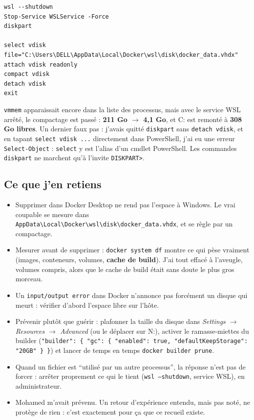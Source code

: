 \documentclass[10pt,twoside,openany]{article}
\begin{document}
\begin{lstlisting}
wsl --shutdown
Stop-Service WSLService -Force
diskpart

select vdisk file="C:\Users\DELL\AppData\Local\Docker\wsl\disk\docker_data.vhdx"
attach vdisk readonly
compact vdisk
detach vdisk
exit
\end{lstlisting}

\texttt{vmmem} apparaissait encore dans la liste des processus, mais avec le service WSL arrêté, le compactage est passé : \textbf{211 Go $\rightarrow$ 4,1 Go}, et C: est remonté à \textbf{308 Go libres}. Un dernier faux pas : j'avais quitté \texttt{diskpart} sans \texttt{detach vdisk}, et en tapant \texttt{select vdisk ...} directement dans PowerShell, j'ai eu une erreur \texttt{Select-Object} : \texttt{select} y est l'alias d'un cmdlet PowerShell. Les commandes \texttt{diskpart} ne marchent qu'à l'invite \texttt{DISKPART>}.

\subsection*{Ce que j'en retiens}
\begin{itemize}
  \item Supprimer dans Docker Desktop ne rend pas l'espace à Windows. Le vrai coupable se mesure dans \texttt{AppData\textbackslash Local\textbackslash Docker\textbackslash wsl\textbackslash disk\textbackslash docker\_data.vhdx}, et se règle par un compactage.
  \item Mesurer avant de supprimer : \texttt{docker system df} montre ce qui pèse vraiment (images, conteneurs, volumes, \textbf{cache de build}). J'ai tout effacé à l'aveugle, volumes compris, alors que le cache de build était sans doute le plus gros morceau.
  \item Un \texttt{input/output error} dans Docker n'annonce pas forcément un disque qui meurt : vérifier d'abord l'espace libre sur l'hôte.
  \item Prévenir plutôt que guérir : plafonner la taille du disque dans \textit{Settings $\rightarrow$ Resources $\rightarrow$ Advanced} (ou le déplacer sur N:), activer le ramasse-miettes du builder (\texttt{"builder": \{ "gc": \{ "enabled": true, "defaultKeepStorage": "20GB" \} \}}) et lancer de temps en temps \texttt{docker builder prune}.
  \item Quand un fichier est \enquote{utilisé par un autre processus}, la réponse n'est pas de forcer : arrêter proprement ce qui le tient (\texttt{wsl --shutdown}, service WSL), en administrateur.
  \item Mohamed m'avait prévenu. Un retour d'expérience entendu, mais pas noté, ne protège de rien : c'est exactement pour ça que ce recueil existe.
\end{itemize}
\end{document}
